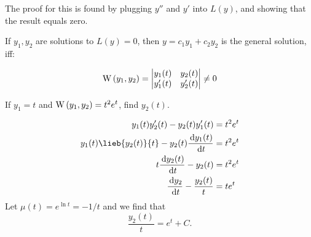 The proof for this is found by plugging $y''$ and $y'$ into $L(y)$, and showing
that the result equals zero.

\begin{theorem}
    If $y_1, y_2$ are solutions to $L(y) = 0$, then $y=c_1y_1 + c_2 y_2$ is the
    general solution, iff:

    \begin{equation}
        \mathrm{W}\left(y_1, y_2\right) = 
        \begin{vmatrix}
            y_1(t)  & y_2(t) \\
            y_1'(t) & y_2'(t)
        \end{vmatrix}
        \neq 0
    \end{equation}
\end{theorem}

\begin{ex}
    If $y_1=t$ and $\mathrm{W}\left(y_1, y_2\right) = t^2 e^t$, find $y_2(t)$.
    \begin{sol}
        \begin{align*}
            y_1(t) y_2 ' (t) - y_2 (t) y_1'(t) &= t^2 e^t \\
            y_1(t)\lieb{y_2 (t)}{t} - y_2(t) \leib{y_1(t)}{t} &= t^2 e^t \\
            t \leib{y_2(t)}{t} - y_2(t) &= t^2 e^t \\
            \leib {y_2}{t} - \frac{y_2(t)}{t} &= t e^t
        \end{align*}
        Let $\mu (t) = e^{\ln t} = - 1/t$ and we find that
        \[ \frac{y_2(t)}{t} = e^t + C. \]
    \end{sol}
\end{ex}
